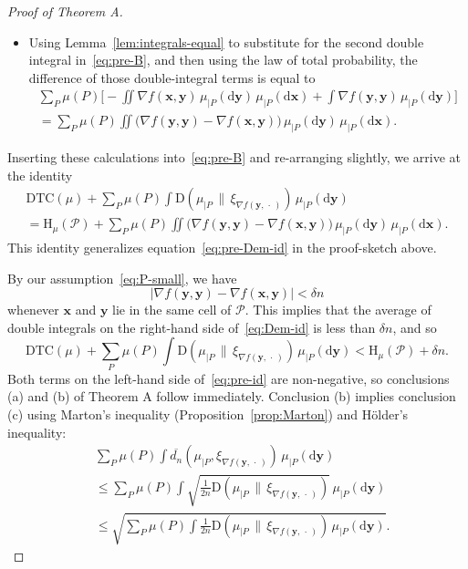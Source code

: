 \documentclass[aop,preprint]{imsart}
\theoremstyle{remark}
\renewcommand{\bf}[1]{\boldsymbol{#1}}
\newcommand{\rmH}{\mathrm{H}}
\renewcommand{\d}{\mathrm{d}}
\renewcommand{\P}{\mathcal{P}}
\newcommand{\ol}[1]{\overline{#1}}
\newcommand{\DTC}{\mathrm{DTC}}
\newcommand{\rmD}{\mathrm{D}}
\begin{document}
\begin{proof}[Proof of Theorem A]
\begin{itemize}
\item[(ii)] Using Lemma~\ref{lem:integrals-equal} to substitute for the second double integral in~\eqref{eq:pre-B}, and then using the law of total probability, the difference of those double-integral terms is equal to
\begin{multline*}
\sum_P\mu(P)\Big[-\iint \nabla f(\bf{x},\bf{y})\,\mu_{|P}(\d\bf{y})\,\mu_{|P}(\d\bf{x}) + \int \nabla f(\bf{y},\bf{y})\,\mu_{|P}(\d\bf{y})\Big]\\
= \sum_P\mu(P)\iint \big(\nabla f(\bf{y},\bf{y}) - \nabla f(\bf{x},\bf{y})\big)\,\mu_{|P}(\d\bf{y})\,\mu_{|P}(\d\bf{x}).
\end{multline*}
\end{itemize}

Inserting these calculations into~\eqref{eq:pre-B} and re-arranging slightly, we arrive at the identity
\begin{multline}\label{eq:Dem-id}
\DTC(\mu) + \sum_P \mu(P)\int \rmD(\mu_{|P}\,\|\,\xi_{\nabla f(\bf{y},\,\cdot\,)})\,\mu_{|P}(\d\bf{y}) \\ = \rmH_\mu(\P) + \sum_P \mu(P)\iint \big(\nabla f(\bf{y},\bf{y}) - \nabla f(\bf{x},\bf{y})\big)\,\mu_{|P}(\d\bf{y})\,\mu_{|P}(\d \bf{x}).
\end{multline}
This identity generalizes equation~\eqref{eq:pre-Dem-id} in the proof-sketch above.

By our assumption~\eqref{eq:P-small}, we have
\begin{equation*}
|\nabla f(\bf{y},\bf{y}) - \nabla f(\bf{x},\bf{y})| < \delta n
\end{equation*}
whenever $\bf{x}$ and $\bf{y}$ lie in the same cell of $\P$. This implies that the average of double integrals on the right-hand side of~\eqref{eq:Dem-id} is less than $\delta n$, and so
\begin{equation}\label{eq:pre-id}
	\DTC(\mu) + \sum_P\mu(P)\int \rmD(\mu_{|P}\,\|\,\xi_{\nabla f(\bf{y},\,\cdot\,)})\,\mu_{|P}(\d\bf{y}) < \rmH_\mu(\P) + \delta n.
\end{equation}
	Both terms on the left-hand side of~\eqref{eq:pre-id} are non-negative, so conclusions (a) and (b) of Theorem A follow immediately. Conclusion (b) implies conclusion (c) using Marton's inequality (Proposition~\ref{prop:Marton}) and H\"older's inequality:
\begin{align*}
	&\sum_P\mu(P)\int \ol{d_n}(\mu_{|P},\xi_{\nabla f(\bf{y},\,\cdot\,)})\,\mu_{|P}(\d\bf{y}) \\ &\leq \sum_P\mu(P)\int \sqrt{\frac{1}{2n}\rmD(\mu_{|P}\,\|\,\xi_{\nabla f(\bf{y},\,\cdot\,)})}\,\mu_{|P}(\d\bf{y}) \\
	&\leq \sqrt{\sum_P\mu(P)\int \frac{1}{2n}\rmD(\mu_{|P}\,\|\,\xi_{\nabla f(\bf{y},\,\cdot\,)})\,\mu_{|P}(\d\bf{y})}.
\end{align*}
	\end{proof}
\end{document}
